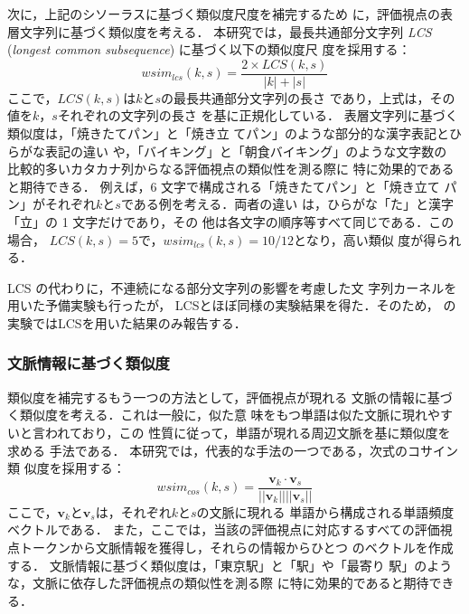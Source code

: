 \documentclass[japanese]{jnlp_1.4}
\def\sec#1{}
\begin{document}
次に，上記のシソーラスに基づく類似度尺度を補完するため
に，評価視点の表層文字列に基づく類似度を考える．
本研究では，最長共通部分文字列 \textit{LCS} (\textit{longest common subsequence}) 
\cite{hirschberg}に基づく以下の類似度尺
度を採用する：
\begin{equation}
\mathit{wsim}_\mathit{lcs}(k, s) = \frac{2 \times \mathit{LCS}(k, s)}{|k|+|s|}
\label{eq:lcs}
\end{equation}
ここで，$\mathit{LCS}(k,s)$は$k$と$s$の最長共通部分文字列の長さ
であり，上式は，その値を$k$，$s$それぞれの文字列の長さ
を基に正規化している．
表層文字列に基づく類似度は，「焼きたてパン」と「焼き立
  てパン」のような部分的な漢字表記とひらがな表記の違い
や，「バイキング」と「朝食バイキング」のような文字数の
比較的多いカタカナ列からなる評価視点の類似性を測る際に
特に効果的であると期待できる．
例えば，6 文字で構成される「焼きたてパン」と「焼き立て
  パン」がそれぞれ$k$と$s$である例を考える．両者の違い
は，ひらがな「た」と漢字「立」の 1 文字だけであり，その
他は各文字の順序等すべて同じである．この場合，
$\mathit{LCS}(k,s)=5$で，$\mathit{wsim}_\mathit{lcs}(k,s)=10/12$となり，高い類似
度が得られる．

LCS の代わりに，不連続になる部分文字列の影響を考慮した文
字列カーネル\cite{lodhi}を用いた予備実験も行ったが，
LCSとほぼ同様の実験結果を得た．そのため，
\sec{experiment}の実験ではLCSを用いた結果のみ報告する．


\subsubsection{文脈情報に基づく類似度}

類似度を補完するもう一つの方法として，評価視点が現れる
文脈の情報に基づく類似度を考える．これは一般に，似た意
味をもつ単語は似た文脈に現れやすいと言われており，この
性質に従って，単語が現れる周辺文脈を基に類似度を求める
手法である．
本研究では，代表的な手法の一つである，次式のコサイン類
似度を採用する\cite{lin}：
\begin{equation}
\label{eq:context}
\mathit{wsim}_\mathit{cos}(k, s) = \frac{\boldsymbol{v}_{k} \cdot \boldsymbol{v}_{s}}{||\boldsymbol{v}_{k}|| ||\boldsymbol{v}_{s}||}
\end{equation}
ここで，$\boldsymbol{v}_k$と$\boldsymbol{v}_s$は，それぞれ$k$と$s$の文脈に現れる
単語から構成される単語頻度ベクトルである．
また，ここでは，当該の評価視点に対応するすべての評価視
点トークンから文脈情報を獲得し，それらの情報からひとつ
のベクトルを作成する．
文脈情報に基づく類似度は，「東京駅」と「駅」や「最寄り
  駅」のような，文脈に依存した評価視点の類似性を測る際
に特に効果的であると期待できる．
\end{document}

